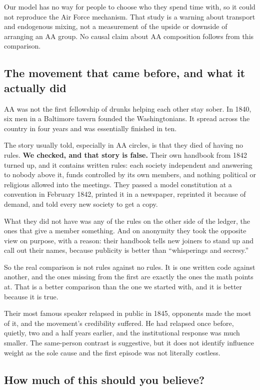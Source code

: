 \documentclass[11pt,a4paper]{article}
\begin{document}
Our model has no way for people to choose who they spend time with, so it could
not reproduce the Air Force mechanism. That study is a warning about transport and
endogenous mixing, not a measurement of the upside or downside of arranging an AA
group. No causal claim about AA composition follows from this comparison.

\subsection{The movement that came before, and what it actually did}

AA was not the first fellowship of drunks helping each other stay sober. In 1840,
six men in a Baltimore tavern founded the Washingtonians. It spread across the
country in four years and was essentially finished in ten.

The story usually told, especially in AA circles, is that they died of having no
rules. \textbf{We checked, and that story is false.} Their own handbook from 1842
turned up, and it contains written rules: each society independent and answering to
nobody above it, funds controlled by its own members, and nothing political or
religious allowed into the meetings. They passed a model constitution at a
convention in February 1842, printed it in a newspaper, reprinted it because of
demand, and told every new society to get a copy.

What they did not have was any of the rules on the other side of the ledger, the
ones that give a member something. And on anonymity they took the opposite view on
purpose, with a reason: their handbook tells new joiners to stand up and call out
their names, because publicity is better than ``whisperings and secresy.''

So the real comparison is not rules against no rules. It is one written code
against another, and the ones missing from the first are exactly the ones the math
points at. That is a better comparison than the one we started with, and it is
better because it is true.

Their most famous speaker relapsed in public in 1845, opponents made the most of
it, and the movement's credibility suffered. He had relapsed once before, quietly,
two and a half years earlier, and the institutional response was much smaller.
The same-person contrast is suggestive, but it does not identify influence weight
as the sole cause and the first episode was not literally costless.

\subsection{How much of this should you believe?}
\end{document}
